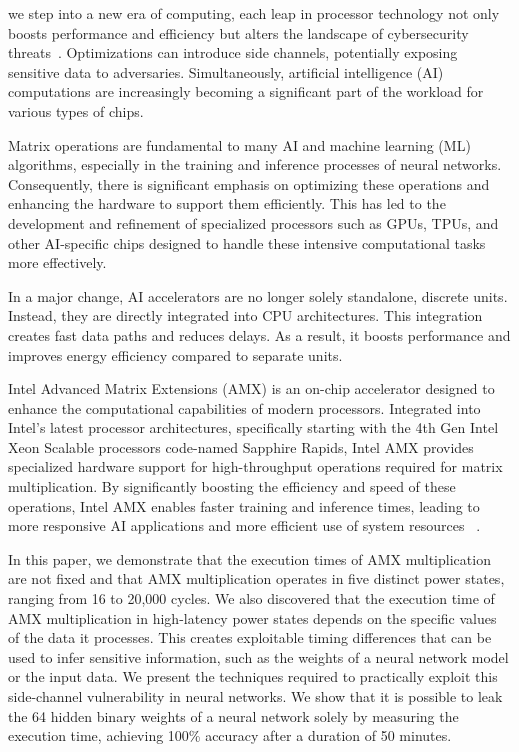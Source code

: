 we step into a new era of computing, each leap in processor technology not only boosts performance and efficiency but alters the landscape of cybersecurity threats~\cite{pandorasbox}. 
Optimizations can introduce side channels, potentially exposing sensitive data to adversaries. Simultaneously, artificial intelligence (AI) computations are increasingly becoming a significant part of the workload for various types of chips.

Matrix operations are fundamental to many AI and machine learning (ML) algorithms, especially in the training and inference processes of neural networks. Consequently, there is significant emphasis on optimizing these operations and enhancing the hardware to support them efficiently. This has led to the development and refinement of specialized processors such as GPUs, TPUs, and other AI-specific chips designed to handle these intensive computational tasks more effectively.

In a major change, AI accelerators are no longer solely standalone, discrete units. Instead, they are directly integrated into CPU architectures\cite{jeong2021rasa,jeong2023vegeta,nassif2022sapphire, elster2022nvidia}. This integration creates fast data paths and reduces delays. As a result, it boosts performance and improves energy efficiency compared to separate units.

Intel Advanced Matrix Extensions (AMX) is an on-chip accelerator designed to enhance the computational capabilities of modern processors. Integrated into Intel's latest processor architectures, specifically starting with the 4th Gen Intel Xeon Scalable processors code-named Sapphire Rapids, Intel AMX provides specialized hardware support for high-throughput operations required for matrix multiplication. By significantly boosting the efficiency and speed of these operations, Intel AMX enables faster training and inference times, leading to more responsive AI applications and more efficient use of system resources ~\cite{intel2022amx}. 



In this paper, we demonstrate that the execution times of AMX multiplication are not fixed and that AMX multiplication operates in five distinct power states, ranging from 16 to 20,000 cycles. %
We also discovered that the execution time of AMX multiplication in high-latency power states depends on the specific values of the data it processes. This creates exploitable timing differences that can be used to infer sensitive information, such as the weights of a neural network model or the input data. We present the techniques required to practically exploit this side-channel vulnerability in neural networks. We show that it is possible to leak the 64 hidden binary weights of a neural network solely by measuring the execution time, achieving 100\% accuracy after a duration of 50 minutes.